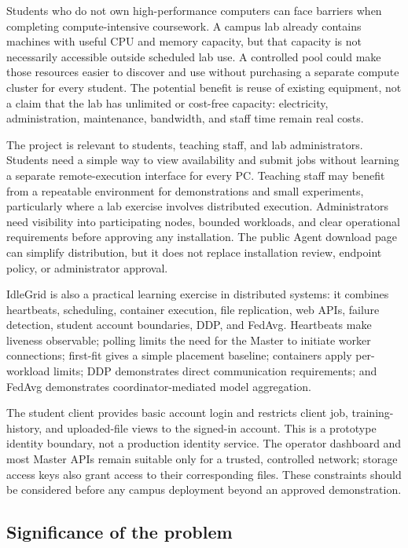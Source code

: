 \documentclass{article}
\begin{document}
Students who do not own high-performance computers can face barriers when completing compute-intensive coursework. A campus lab already contains machines with useful CPU and memory capacity, but that capacity is not necessarily accessible outside scheduled lab use. A controlled pool could make those resources easier to discover and use without purchasing a separate compute cluster for every student. The potential benefit is reuse of existing equipment, not a claim that the lab has unlimited or cost-free capacity: electricity, administration, maintenance, bandwidth, and staff time remain real costs.

The project is relevant to students, teaching staff, and lab administrators. Students need a simple way to view availability and submit jobs without learning a separate remote-execution interface for every PC. Teaching staff may benefit from a repeatable environment for demonstrations and small experiments, particularly where a lab exercise involves distributed execution. Administrators need visibility into participating nodes, bounded workloads, and clear operational requirements before approving any installation. The public Agent download page can simplify distribution, but it does not replace installation review, endpoint policy, or administrator approval.

IdleGrid is also a practical learning exercise in distributed systems: it combines heartbeats, scheduling, container execution, file replication, web APIs, failure detection, student account boundaries, DDP, and FedAvg. Heartbeats make liveness observable; polling limits the need for the Master to initiate worker connections; first-fit gives a simple placement baseline; containers apply per-workload limits; DDP demonstrates direct communication requirements; and FedAvg demonstrates coordinator-mediated model aggregation.

The student client provides basic account login and restricts client job, training-history, and uploaded-file views to the signed-in account. This is a prototype identity boundary, not a production identity service. The operator dashboard and most Master APIs remain suitable only for a trusted, controlled network; storage access keys also grant access to their corresponding files. These constraints should be considered before any campus deployment beyond an approved demonstration.

    \subsection{Significance of the problem}
	
\end{document}
